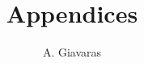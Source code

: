 \documentclass{paper}
\title{Appendices}
\author{A. Giavaras}
\date{}
\theoremstyle{theorem}
\theoremstyle{definition}
\theoremstyle{remark}
\begin{document}
\maketitle
\tableofcontents

\clearpage

\begin{appendices}


\end{appendices}

\clearpage


\end{document}
